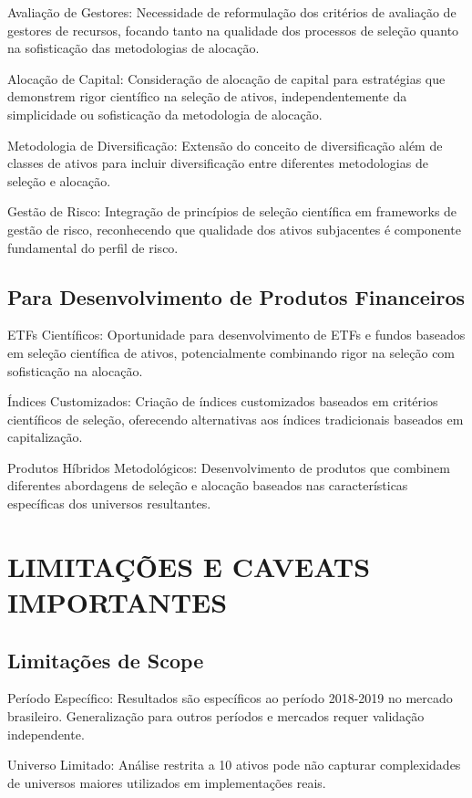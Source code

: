 Avaliação de Gestores: Necessidade de reformulação dos critérios de avaliação de gestores de recursos, focando tanto na qualidade dos processos de seleção quanto na sofisticação das metodologias de alocação.

Alocação de Capital: Consideração de alocação de capital para estratégias que demonstrem rigor científico na seleção de ativos, independentemente da simplicidade ou sofisticação da metodologia de alocação.

Metodologia de Diversificação: Extensão do conceito de diversificação além de classes de ativos para incluir diversificação entre diferentes metodologias de seleção e alocação.

Gestão de Risco: Integração de princípios de seleção científica em frameworks de gestão de risco, reconhecendo que qualidade dos ativos subjacentes é componente fundamental do perfil de risco.

\subsection{Para Desenvolvimento de Produtos Financeiros}

ETFs Científicos: Oportunidade para desenvolvimento de ETFs e fundos baseados em seleção científica de ativos, potencialmente combinando rigor na seleção com sofisticação na alocação.

Índices Customizados: Criação de índices customizados baseados em critérios científicos de seleção, oferecendo alternativas aos índices tradicionais baseados em capitalização.

Produtos Híbridos Metodológicos: Desenvolvimento de produtos que combinem diferentes abordagens de seleção e alocação baseados nas características específicas dos universos resultantes.

\section{LIMITAÇÕES E CAVEATS IMPORTANTES}

\subsection{Limitações de Scope}

Período Específico: Resultados são específicos ao período 2018-2019 no mercado brasileiro. Generalização para outros períodos e mercados requer validação independente.

Universo Limitado: Análise restrita a 10 ativos pode não capturar complexidades de universos maiores utilizados em implementações reais.

